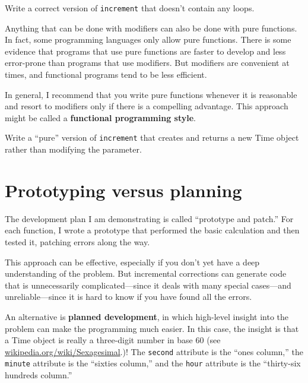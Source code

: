 \documentclass[10pt]{book}
\begin{document}
\begin{ex}
Write a correct version of {\tt increment} that
doesn't contain any loops.
\end{ex}

Anything that can be done with modifiers can also be done with pure
functions.  In fact, some programming languages only allow pure
functions.  There is some evidence that programs that use pure
functions are faster to develop and less error-prone than programs
that use modifiers.  But modifiers are convenient at times,
and functional programs tend to be less efficient.

In general, I recommend that you write pure functions whenever it is
reasonable and resort to modifiers only if there is a compelling
advantage.  This approach might be called a {\bf functional
programming style}.



\begin{ex}
Write a ``pure'' version of {\tt increment} that creates and returns
a new Time object rather than modifying the parameter.
\end{ex}


\section{Prototyping versus planning}
\label{prototype}


The development plan I am demonstrating is called ``prototype and
patch.''  For each function, I wrote a prototype that performed the
basic calculation and then tested it, patching errors along the
way.

This approach can be effective, especially if you don't yet have a
deep understanding of the problem.  But incremental corrections can
generate code that is unnecessarily complicated---since it deals with
many special cases---and unreliable---since it is hard to know if you
have found all the errors.

An alternative is {\bf planned development}, in which high-level
insight into the problem can make the programming much easier.  In
this case, the insight is that a Time object is really a three-digit
number in base 60 (see \url{wikipedia.org/wiki/Sexagesimal}.)!  The
{\tt second} attribute is the ``ones column,'' the {\tt minute}
attribute is the ``sixties column,'' and the {\tt hour} attribute is
the ``thirty-six hundreds column.''
\end{document}
